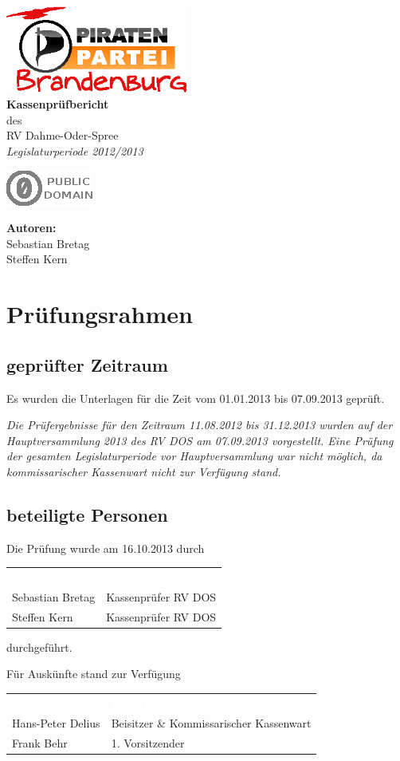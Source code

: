 \documentclass[%
	titlepage,oneside,12pt,headlines=1.5,numbers=noenddot, chapterprefix=false,parskip=full-,DIV=14,pagesize]{scrreprt}
\makeatletter
\newcommand*\@lizenz{
		\includegraphics[scale=2.5]{./pd.eps}
	}
\renewcommand\maketitle{
	\begingroup
		\begin{titlepage}
			\begin{center}
					\includegraphics[width=6cm]{logo}\\[4cm]
				{\bfseries
					\makeatletter
						\Huge Kassenprüfbericht
					\makeatother
				}\\[5mm]
				\makeatletter
					{\Large des}\\[5mm]
					{\Large RV Dahme-Oder-Spree}\\[50mm]
					\textit{\Large Legislaturperiode 2012/2013 }
				\makeatother
					
			\end{center}
    		\vspace*{\fill} 
    		\begin{minipage}[b]{8cm}
    		\begin{flushleft}
    			\makeatletter
    				\@lizenz
    			\makeatother
    		\end{flushleft}
    	\end{minipage}
    		\hfill
    		\begin{minipage}[b]{8cm} 
    			\begin{flushright}
    				\textbf{Autoren:}\\[2mm]
    				Sebastian Bretag\\
    				Steffen Kern
    			\end{flushright}
    		\end{minipage}
    	\end{titlepage}
	\endgroup
	\pagebreak
	\onehalfspacing 
	\pagenumbering{arabic}
	\setcounter{page}{1}
	\tableofcontents
	\pagebreak
}
\renewcommand{\arraystretch}{1.2}%
\makeatother
\begin{document}
 
\maketitle

\chapter{Prüfungsrahmen}
\section{geprüfter Zeitraum}
Es wurden die Unterlagen für die Zeit vom 01.01.2013 bis 07.09.2013 geprüft.

\textit{Die Prüfergebnisse für den Zeitraum 11.08.2012 bis 31.12.2013 wurden auf der Hauptversammlung 2013 des RV DOS am 07.09.2013 vorgestellt. Eine Prüfung der gesamten Legislaturperiode vor Hauptversammlung war nicht möglich, da kommissarischer Kassenwart nicht zur Verfügung stand.}
\section{beteiligte Personen}
Die Prüfung wurde am 16.10.2013 durch
\renewcommand{\arraystretch}{1.2}%
\setlength{\arrayrulewidth}{1.5pt}%
%
\begin{longtable}[ht]{|p{} p{}|}
\hline\rowcolor{pirateorange} 
	\textcolor{white}{\textbf{Name}} & \textcolor{white}{\textbf{Funktion}}  \\
        Sebastian Bretag & Kassenprüfer RV DOS \\ 
        Steffen Kern  & Kassenprüfer RV DOS  \\
\hline
\end{longtable}\vspace{-1.25em}
durchgeführt.

Für Auskünfte stand zur Verfügung
\renewcommand{\arraystretch}{1.2}%
\setlength{\arrayrulewidth}{1.5pt}%
%
\begin{longtable}[ht]{|p{} p{}|}
\hline\rowcolor{pirateorange} 
	\textcolor{white}{\textbf{Name}} & \textcolor{white}{\textbf{Funktion}}  \\
        Hans-Peter Delius & Beisitzer \& Kommissarischer Kassenwart  \\ 
        Frank Behr & 1. Vorsitzender \\\hline
\end{longtable}\vspace{-1.25em}
\end{document}

